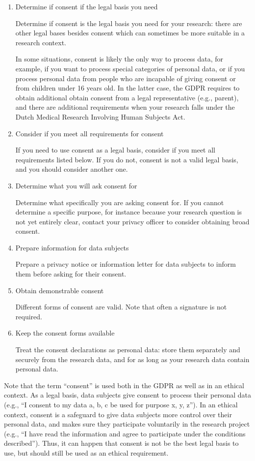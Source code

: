 \documentclass[
]{book}
\begin{document}
\begin{enumerate}
\def\labelenumi{\arabic{enumi}.}
\item
  Determine if consent if the legal basis you need

  Determine if consent is the legal basis you need for your
  research: there are other legal bases besides consent which can sometimes be
  more suitable in a research context.

  In some situations, consent is likely the only way to process data, for
  example, if you want to process
  special categories of personal data,
  or if you process personal data from people who are incapable of giving consent
  or from children under 16 years old. In the latter
  case, the GDPR requires to obtain additional obtain consent from a legal
  representative (e.g., parent), and there are additional requirements when your
  research falls under the Dutch
  Medical Research Involving Human Subjects Act.
\item
  Consider if you meet all requirements for consent

  If you need to use consent as a legal basis, consider if you meet
  all requirements listed below. If you do not,
  consent is not a valid legal basis, and you should consider another one.
\item
  Determine what you will ask consent for

  Determine what specifically you are asking consent for. If you cannot
  determine a specific purpose, for instance because your research question is
  not yet entirely clear, contact
  your privacy officer
  to consider obtaining broad consent.
\item
  Prepare information for data subjects

  Prepare a
  privacy notice or information letter
  for data subjects to inform them before asking for their consent.
\item
  Obtain demonstrable consent

  Different forms of consent are valid. Note
  that often a signature is not required.
\item
  Keep the consent forms available

  Treat the consent declarations as personal data:
  store them separately and securely from the
  research data, and for as long as your research data contain personal data.
\end{enumerate}

Note that the term ``consent'' is used both in the GDPR as well as in an ethical
context. As a legal basis, data subjects give consent
to process their personal data (e.g., ``I consent to my data a, b, c be used for
purpose x, y, z''). In an ethical context, consent is a
safeguard
to give data subjects more control over their personal data, and makes sure they
participate voluntarily in the research project (e.g., ``I have read the
information and agree to participate under the conditions described''). Thus, it
can happen that consent is not be the best legal basis to use, but should still
be used as an ethical requirement.
\end{document}
